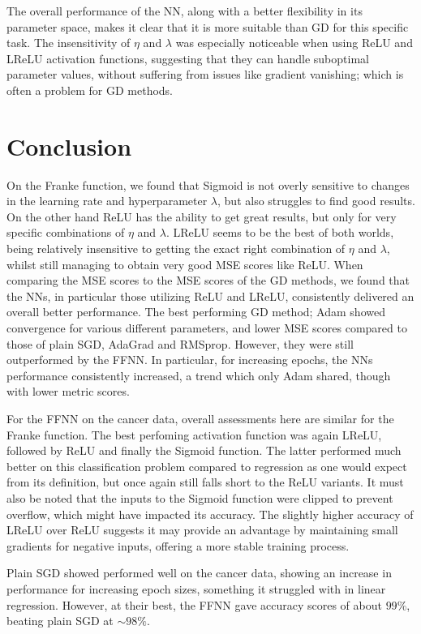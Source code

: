 \documentclass[%
reprint,s
amsmath,amssymb,
aps,
]{revtex4-2}
\begin{document}
The overall performance of the NN, along with a better flexibility in its parameter space, makes it clear that it is more suitable than GD for this specific task. The insensitivity of $\eta$ and $\lambda$ was especially noticeable when using ReLU and LReLU activation functions, suggesting that they can handle suboptimal parameter values, without suffering from issues like gradient vanishing; which is often a problem for GD methods.

\section{Conclusion}
On the Franke function, we found that Sigmoid is not overly sensitive to changes in the learning rate and hyperparameter $\lambda$, but also struggles to find good results. On the other hand ReLU has the ability to get great results, but only for very specific combinations of $\eta$ and $\lambda$. LReLU seems to be the best of both worlds, being relatively insensitive to getting the exact right combination of $\eta$ and $\lambda$, whilst still managing to obtain very good MSE scores like ReLU. When comparing the MSE scores to the MSE scores of the GD methods, we found that the NNs, in particular those utilizing ReLU and LReLU, consistently delivered an overall better performance. The best performing GD method; Adam showed convergence for various different parameters, and lower MSE scores compared to those of plain SGD,  AdaGrad and RMSprop. However, they were still outperformed by the FFNN. In particular, for increasing epochs, the NNs performance consistently increased, a trend which only Adam shared, though with lower metric scores.

For the FFNN on the cancer data, overall assessments here are similar for the Franke function. The best perfoming activation function was again LReLU, followed by ReLU and finally the Sigmoid function. The latter performed much better on this classification problem compared to regression as one would expect from its definition, but once again still falls short to the ReLU variants. It must also be noted that the inputs to the Sigmoid function were clipped to prevent overflow, which might have impacted its accuracy. The slightly higher accuracy of LReLU over ReLU suggests it may provide an advantage by maintaining small gradients for negative inputs, offering a more stable training process. 

Plain SGD showed performed well on the cancer data, showing an increase in performance for increasing epoch sizes, something it struggled with in linear regression. However, at their best, the FFNN gave accuracy scores of about \(99\%\), beating plain SGD at \(\sim 98\%\).
\end{document}
